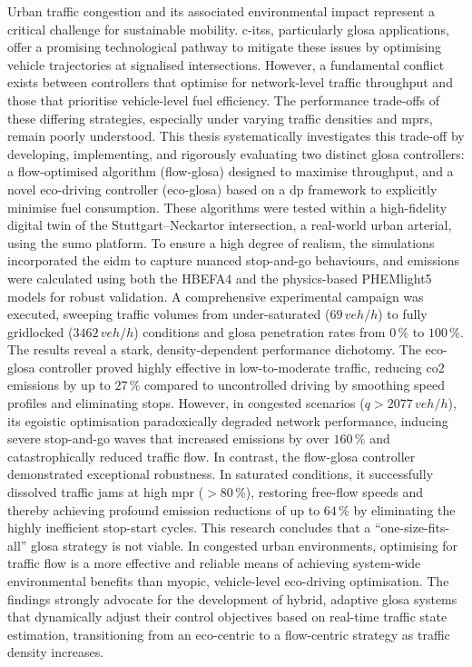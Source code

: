 Urban traffic congestion and its associated environmental impact represent a critical challenge for sustainable mobility. \acp{c-its}, particularly \ac{glosa} applications, offer a promising technological pathway to mitigate these issues by optimising vehicle trajectories at signalised intersections. However, a fundamental conflict exists between controllers that optimise for network-level traffic throughput and those that prioritise vehicle-level fuel efficiency. The performance trade-offs of these differing strategies, especially under varying traffic densities and \acp{mpr}, remain poorly understood.
\mynewline
This thesis systematically investigates this trade-off by developing, implementing, and rigorously evaluating two distinct \ac{glosa} controllers: a flow-optimised algorithm (\ac{flow-glosa}) designed to maximise throughput, and a novel eco-driving controller (\ac{eco-glosa}) based on a \ac{dp} framework to explicitly minimise fuel consumption. These algorithms were tested within a high-fidelity digital twin of the Stuttgart–Neckartor intersection, a real-world urban arterial, using the \ac{sumo} platform. To ensure a high degree of realism, the simulations incorporated the \ac{eidm} to capture nuanced stop-and-go behaviours, and emissions were calculated using both the HBEFA4 and the physics-based PHEMlight5 models for robust validation. A comprehensive experimental campaign was executed, sweeping traffic volumes from under-saturated ($69\,\unit{veh/h}$) to fully gridlocked ($3462\,\unit{veh/h}$) conditions and \ac{glosa} penetration rates from $0\,\%$ to $100\,\%$.
\mynewline
The results reveal a stark, density-dependent performance dichotomy. The \ac{eco-glosa} controller proved highly effective in low-to-moderate traffic, reducing \ac{co2} emissions by up to $27\,\%$ compared to uncontrolled driving by smoothing speed profiles and eliminating stops. However, in congested scenarios ($q > 2077\,\unit{veh/h}$), its egoistic optimisation paradoxically degraded network performance, inducing severe stop-and-go waves that increased emissions by over $160\,\%$ and catastrophically reduced traffic flow. In contrast, the \ac{flow-glosa} controller demonstrated exceptional robustness. In saturated conditions, it successfully dissolved traffic jams at high \ac{mpr} ($>80\,\%$), restoring free-flow speeds and thereby achieving profound emission reductions of up to $64\,\%$ by eliminating the highly inefficient stop-start cycles.
\mynewline
This research concludes that a \enquote{one-size-fits-all} \ac{glosa} strategy is not viable. In congested urban environments, optimising for traffic flow is a more effective and reliable means of achieving system-wide environmental benefits than myopic, vehicle-level eco-driving optimisation. The findings strongly advocate for the development of hybrid, adaptive \ac{glosa} systems that dynamically adjust their control objectives based on real-time traffic state estimation, transitioning from an eco-centric to a flow-centric strategy as traffic density increases.
